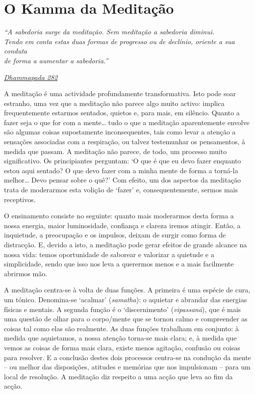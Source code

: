 
\chapter{O Kamma da Meditação}


\emph{``A sabedoria surge da meditação. Sem meditação a sabedoria diminui.\\
Tendo em conta estas duas formas de progresso ou de declínio, oriente a sua conduta\\
de forma a aumentar a sabedoria.''}

\href{https://suttacentral.net/dhp273-289/en/buddharakkhita}{\emph{Dhammapada 282}}

A meditação é uma actividade profundamente transformativa. Isto pode soar estranho, uma vez que a meditação não parece algo muito activo: implica frequentemente estarmos sentados, quietos e, para mais, em silêncio. Quanto a fazer seja o que for com a mente\ldots{} tudo o que a meditação aparentemente envolve são algumas coisas supostamente inconsequentes, tais como levar a atenção a sensações associadas com a respiração, ou talvez testemunhar os pensamentos, à medida que passam. A meditação não parece, de todo, um processo muito significativo. Os principiantes perguntam: `O que é que eu devo fazer enquanto estou aqui sentado? O que devo fazer com a minha mente de forma a torná-la melhor\ldots{} Devo pensar sobre o quê?' Com efeito, um dos aspectos da meditação trata de moderarmos esta volição de `fazer' e, consequentemente, sermos mais receptivos.

O ensinamento consiste no seguinte: quanto mais moderarmos desta forma a nossa energia, maior luminosidade, confiança e clareza iremos atingir. Então, a inquietude, a preocupação e os impulsos, deixam de surgir como forma de distracção. E, devido a isto, a meditação pode gerar efeitos de grande alcance na nossa vida: temos oportunidade de saborear e valorizar a quietude e a simplicidade, sendo que isso nos leva a querermos menos e a mais facilmente abrirmos mão.

A meditação centra-se à volta de duas funções. A primeira é uma espécie de cura, um tónico. Denomina-se `acalmar' (\emph{samatha}): o aquietar e abrandar das energias físicas e mentais. A segunda função é o `discernimento' (\emph{vipassanā}), que é mais uma questão de olhar para o corpo/mente que se tornou calmo e compreender as coisas tal como elas são realmente. As duas funções trabalham em conjunto: à medida que aquietamos, a nossa atenção torna-se mais clara; e, à medida que vemos as coisas de forma mais clara, existe menos agitação, confusão ou coisas para resolver. E a conclusão destes dois processos centra-se na condução da mente -- ou melhor das disposições, atitudes e memórias que nos impulsionam -- para um local de resolução. A meditação diz respeito a uma acção que leva ao fim da acção.

